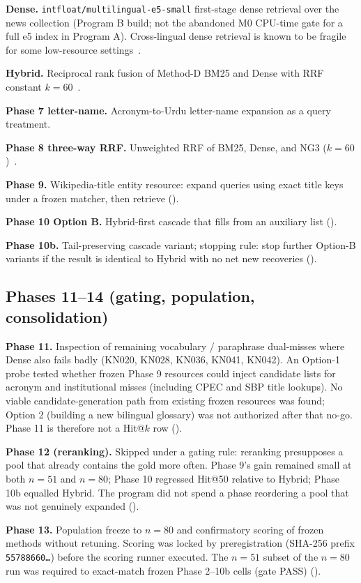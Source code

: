 \documentclass[10pt,letterpaper]{article}
\begin{document}
\textbf{Dense.} \texttt{intfloat/multilingual-e5-small} first-stage dense retrieval over the news collection (Program B build; not the abandoned M0 CPU-time gate for a full e5 index in Program A). Cross-lingual dense retrieval is known to be fragile for some low-resource settings~\cite{bib7,bib8}.

\textbf{Hybrid.} Reciprocal rank fusion of Method-D BM25 and Dense with RRF constant $k = 60$~\cite{bib15}.

\textbf{Phase 7 letter-name.} Acronym-to-Urdu letter-name expansion as a query treatment.

\textbf{Phase 8 three-way RRF.} Unweighted RRF of BM25, Dense, and NG3 ($k = 60$)~\cite{bib15}.

\textbf{Phase 9.} Wikipedia-title entity resource: expand queries using exact title keys under a frozen matcher, then retrieve ().

\textbf{Phase 10 Option B.} Hybrid-first cascade that fills from an auxiliary list ().

\textbf{Phase 10b.} Tail-preserving cascade variant; stopping rule: stop further Option-B variants if the result is identical to Hybrid with no net new recoveries ().

\subsection*{Phases 11--14 (gating, population, consolidation)}

\textbf{Phase 11.} Inspection of remaining vocabulary / paraphrase dual-misses where Dense also fails badly (KN020, KN028, KN036, KN041, KN042). An Option-1 probe tested whether frozen Phase 9 resources could inject candidate lists for acronym and institutional misses (including CPEC and SBP title lookups). No viable candidate-generation path from existing frozen resources was found; Option 2 (building a new bilingual glossary) was not authorized after that no-go. Phase 11 is therefore not a Hit@$k$ row ().

\textbf{Phase 12 (reranking).} Skipped under a gating rule: reranking presupposes a pool that already contains the gold more often. Phase 9's gain remained small at both $n = 51$ and $n = 80$; Phase 10 regressed Hit@50 relative to Hybrid; Phase 10b equalled Hybrid. The program did not spend a phase reordering a pool that was not genuinely expanded ().

\textbf{Phase 13.} Population freeze to $n = 80$ and confirmatory scoring of frozen methods without retuning. Scoring was locked by preregistration (SHA-256 prefix \texttt{55788660\ldots}) before the scoring runner executed. The $n = 51$ subset of the $n = 80$ run was required to exact-match frozen Phase 2--10b cells (gate PASS) ().
\end{document}
